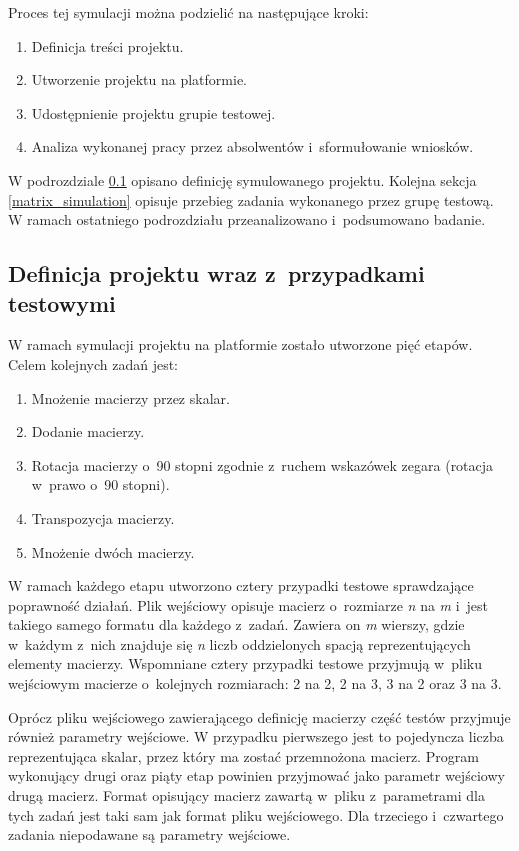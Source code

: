 Proces tej symulacji można podzielić na następujące kroki:
\begin{enumerate}
    \item Definicja treści projektu.
    \item Utworzenie projektu na platformie.
    \item Udostępnienie projektu grupie testowej.
    \item Analiza wykonanej pracy przez absolwentów i~sformułowanie wniosków.
\end{enumerate}

W podrozdziale \ref{matrix_project_definition} opisano definicję symulowanego projektu.
Kolejna sekcja \ref{matrix_simulation} opisuje przebieg zadania wykonanego przez grupę testową.
W ramach ostatniego podrozdziału przeanalizowano i~podsumowano badanie.


\subsection{Definicja projektu wraz z~przypadkami testowymi}
\label{matrix_project_definition}

W ramach symulacji projektu na platformie zostało utworzone pięć etapów.
Celem kolejnych zadań jest:
\begin{enumerate}
    \item Mnożenie macierzy przez skalar.
    \item Dodanie macierzy.
    \item Rotacja macierzy o~90 stopni zgodnie z~ruchem wskazówek zegara (rotacja w~prawo o~90 stopni).
    \item Transpozycja macierzy.
    \item Mnożenie dwóch macierzy.
\end{enumerate}

W ramach każdego etapu utworzono cztery przypadki testowe sprawdzające poprawność działań.
Plik wejściowy opisuje macierz o~rozmiarze \textit{n} na \textit{m} i~jest takiego samego formatu dla każdego z~zadań.
Zawiera on \textit{m} wierszy, gdzie w~każdym z~nich znajduje się \textit{n} liczb oddzielonych spacją reprezentujących elementy macierzy.
Wspomniane cztery przypadki testowe przyjmują w~pliku wejściowym macierze o~kolejnych rozmiarach: 2 na 2, 2 na 3, 3 na 2 oraz 3 na 3.

Oprócz pliku wejściowego zawierającego definicję macierzy część testów przyjmuje również parametry wejściowe.
W przypadku pierwszego jest to pojedyncza liczba reprezentująca skalar, przez który ma zostać przemnożona macierz.
Program wykonujący drugi oraz piąty etap powinien przyjmować jako parametr wejściowy drugą macierz.
Format opisujący macierz zawartą w~pliku z~parametrami dla tych zadań jest taki sam jak format pliku wejściowego.
Dla trzeciego i~czwartego zadania niepodawane są parametry wejściowe.


